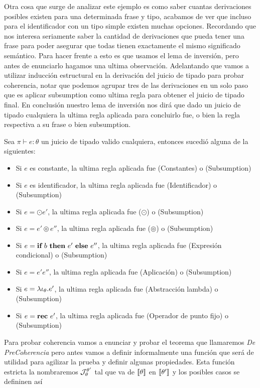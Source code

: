 Otra cosa que surge de analizar este ejemplo es como saber cuantas derivaciones
posibles existen para una determinada frase y tipo, acabamos de ver que
incluso para el identificador con un tipo simple existen muchas opciones.
Recordando que nos interesa seriamente saber la cantidad de derivaciones 
que pueda tener una frase para poder asegurar que todas tienen exactamente
el mismo significado sem\'antico. Para hacer frente a esto es que usamos 
el lema de inversi\'on, pero antes de enunciarlo hagamos una ultima observaci\'on.
Adelantando que vamos a utilizar inducci\'on estructural en la derivaci\'on
del juicio de tipado para probar coherencia, notar que podemos agrupar
tres de las derivaciones en un solo paso que es aplicar 
subsumption como ultima regla para obtener el juicio de tipado final. En
conclusi\'on nuestro lema de inversi\'on nos dir\'a que dado un juicio de 
tipado cualquiera la ultima regla aplicada para concluirlo fue, o bien
la regla respectiva a su frase o bien subsumption.

\begin{lemma}[De inversi\'on]
Sea $\pi \vdash e : \theta$ un juicio de tipado valido cualquiera, entonces
sucedi\'o alguna de la siguientes:

\begin{itemize}
\item Si $e$ es constante, la ultima regla aplicada fue (Constantes) o (Subsumption)
\item Si $e$ es identificador, la ultima regla aplicada fue (Identificador) o (Subsumption)
\item Si $e = \odot e'$, la ultima regla aplicada fue ($\odot$) o (Subsumption)
\item Si $e = e' \circledcirc e''$, la ultima regla aplicada fue 
($\circledcirc$) o (Subsumption)
\item Si $e = \textbf{if} \ b \ \textbf{then} \ e' \ \textbf{else} \ e''$, la ultima regla aplicada fue 
(Expresi\'on condicional) o (Subsumption)
\item Si $e = e'e''$, la ultima regla aplicada fue (Aplicaci\'on) o (Subsumption)
\item Si $e = \lambda \iota_{\theta} . e'$, la ultima regla aplicada fue 
(Abstracci\'on lambda) o (Subsumption)
\item Si $e = \textbf{rec} \ e'$, la ultima regla aplicada fue (Operador de punto fijo) o (Subsumption)
\end{itemize}

\end{lemma}

Para probar coherencia vamos a enunciar y probar el teorema que llamaremos
\textit{De PreCoherencia} pero antes vamos a definir informalmente una 
funci\'on que ser\'a de utilidad para agilizar la prueba y definir algunas
propiedades. Esta funci\'on estricta la nombraremos $\mathcal{J}_{\theta}^{\theta'}$ tal que
va de $\llbracket \theta \rrbracket$ en $\llbracket \theta' \rrbracket$ y los posibles casos se defininen as\'i\\

